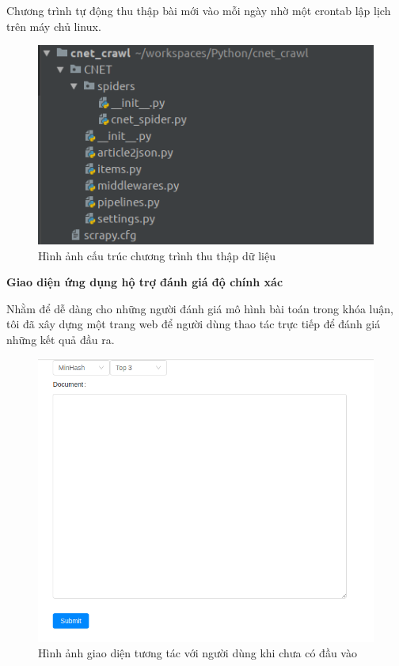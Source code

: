 \documentclass[12pt]{report}
\begin{document}
Chương trình tự động thu thập bài mới vào mỗi ngày nhờ một crontab lập lịch trên máy chủ linux.
\begin{figure}[h]
	\centering
	\includegraphics[scale=0.5]{scrapy}
	\caption{Hình ảnh cấu trúc chương trình thu thập dữ liệu}
\end{figure}

\newpage
\newpage
\noindent\textbf{Giao diện ứng dụng hộ trợ đánh giá độ chính xác}

Nhằm để dễ dàng cho những người đánh giá mô hình bài toán trong khóa luận, tôi đã xây dựng một trang web để người dùng thao tác trực tiếp để đánh giá những kết quả đầu ra. 

\begin{figure}[h]
	\centering
	\includegraphics[scale=0.4]{frontend}
	\caption{Hình ảnh giao diện tương tác với người dùng khi chưa có đầu vào}
\end{figure}
\end{document}

